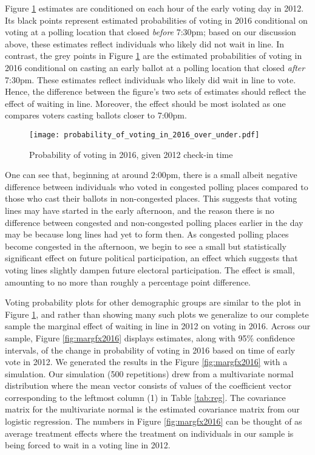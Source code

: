 \documentclass[12pt,titlepage]{article}
\begin{document}
Figure \ref{fig:prvoting2016} estimates are conditioned on each hour
of the early voting day in 2012. Its black points represent estimated
probabilities of voting in 2016 conditional on voting at a polling
location that closed \emph{before} 7:30pm; based on our discussion
above, these estimates reflect individuals who likely did not wait in
line.  In contrast, the grey points in Figure \ref{fig:prvoting2016}
are the estimated probabilities of voting in 2016 conditional on
casting an early ballot at a polling location that closed \emph{after}
7:30pm.  These estimates reflect individuals who likely did wait in
line to vote.  Hence, the difference between the figure's two sets of
estimates should reflect the effect of waiting in line.  Moreover, the
effect should be most isolated as one compares voters casting ballots
closer to 7:00pm.

\begin{figure}[!ht]
\caption{Probability of voting in 2016, given 2012 check-in time}
  \label{fig:prvoting2016}
  \centering
    \centering\texttt{[image: probability\_of\_voting\_in\_2016\_over\_under.pdf]}
\end{figure}

One can see that, beginning at around 2:00pm, there is a small albeit
negative difference between individuals who voted in congested polling
places compared to those who cast their ballots in non-congested
places.  This suggests that voting lines may have started in the early
afternoon, and the reason there is no difference between congested and
non-congested polling places earlier in the day may be because long
lines had yet to form then. As congested polling places become
congested in the afternoon, we begin to see a small but statistically
significant effect on future political participation, an effect which
suggests that voting lines slightly dampen future electoral
participation.  The effect is small, amounting to no more than roughly
a percentage point difference.

Voting probability plots for other demographic groups are similar to
the plot in Figure \ref{fig:prvoting2016}, and rather than showing
many such plots we generalize to our complete sample the marginal
effect of waiting in line in 2012 on voting in 2016.  Across our
sample, Figure \ref{fig:margfx2016} displays estimates, along with
95\% confidence intervals, of the change in probability of voting in
2016 based on time of early vote in 2012.  We generated the results in
the Figure \ref{fig:margfx2016} with a simulation.  Our simulation
(500 repetitions) drew from a multivariate normal distribution where
the mean vector consists of values of the coefficient vector
corresponding to the leftmost column (1) in Table \ref{tab:reg}.  The
covariance matrix for the multivariate normal is the estimated
covariance matrix from our logistic regression.  The numbers in Figure
\ref{fig:margfx2016} can be thought of as average treatment effects
where the treatment on individuals in our sample is being forced to
wait in a voting line in 2012.
\end{document}
